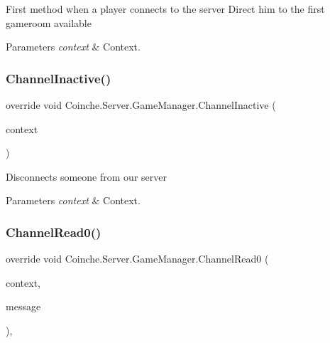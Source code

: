 First method when a player connects to the server Direct him to the first gameroom available 


\begin{DoxyParams}{Parameters}
{\em context} & Context.\\
\hline
\end{DoxyParams}
\mbox{\label{class_coinche_1_1_server_1_1_game_manager_a69ffe1493216ea1cdbaa0cbd2694df95}} 
\subsubsection{\texorpdfstring{Channel\+Inactive()}{ChannelInactive()}}
{\footnotesize\ttfamily override void Coinche.\+Server.\+Game\+Manager.\+Channel\+Inactive (\begin{DoxyParamCaption}\item[{I\+Channel\+Handler\+Context}]{context }\end{DoxyParamCaption})\hspace{0.3cm}{\ttfamily [inline]}}



Disconnects someone from our server 


\begin{DoxyParams}{Parameters}
{\em context} & Context.\\
\hline
\end{DoxyParams}
\mbox{\label{class_coinche_1_1_server_1_1_game_manager_a94fb29dfd64df404419f8136c1d0c907}} 
\subsubsection{\texorpdfstring{Channel\+Read0()}{ChannelRead0()}}
{\footnotesize\ttfamily override void Coinche.\+Server.\+Game\+Manager.\+Channel\+Read0 (\begin{DoxyParamCaption}\item[{I\+Channel\+Handler\+Context}]{context,  }\item[{\hyperlink{class_coinche_1_1_google_1_1_protobuf_1_1_game_request}{Game\+Request}}]{message }\end{DoxyParamCaption})\hspace{0.3cm}{\ttfamily [inline]}, {\ttfamily [protected]}}



